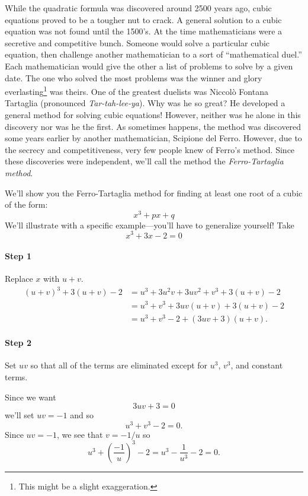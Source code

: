 While the quadratic formula was discovered around 2500 years ago,
cubic equations proved to be a tougher nut to crack. A general
solution to a cubic equation was not found until the 1500's. At the
time mathematicians were a secretive and competitive bunch. Someone
would solve a particular cubic equation, then challenge another
mathematician to a sort of ``mathematical duel.'' Each mathematician
would give the other a list of problems to solve by a given date. The
one who solved the most problems was the winner and glory
everlasting\footnote{This might be a slight exaggeration.}  was
theirs. One of the greatest duelists was Niccol\`{o} Fontana Tartaglia
(pronounced \textit{Tar-tah-lee-ya}). Why was he so great? He
developed a general method for solving cubic equations! However,
neither was he alone in this discovery nor was he the first. As
sometimes happens, the method was discovered some years earlier by
another mathematician, Scipione del Ferro. However, due to the secrecy
and competitiveness, very few people knew of Ferro's method. Since these
discoveries were independent, we'll call the method the
\textit{Ferro-Tartaglia method}.

We'll show you the Ferro-Tartaglia method for finding at least one root of a cubic of the form:
\[
x^3+ px + q
\]
We'll illustrate with a specific example---you'll have to generalize
yourself! Take
\[
x^3 +3x - 2  = 0
\]
\paragraph{Step 1} Replace $x$ with $u+v$. 
\begin{align*}
(u+v)^3 + 3(u+v) - 2  &= u^3 + 3u^2v + 3uv^2 + v^3 + 3(u+v) -2 \\
&= u^3 + v^3 + 3uv(u+v) + 3(u+v) - 2\\
&= u^3 + v^3 - 2 + (3uv+3)(u+v).
\end{align*}
\paragraph{Step 2} 
Set $uv$ so that all of the terms are eliminated except for $u^3$,
$v^3$, and constant terms.  

Since we want 
\[
3uv + 3 = 0
\]
we'll set $uv = -1$ and so 
\[
u^3 + v^3 -2 = 0.
\]
Since $uv = -1$, we see that $v = -1/u$ so
\[
u^3 + \left(\frac{-1}{u}\right)^3  -2 = u^3 - \frac{1}{u^3} - 2= 0.
\]
